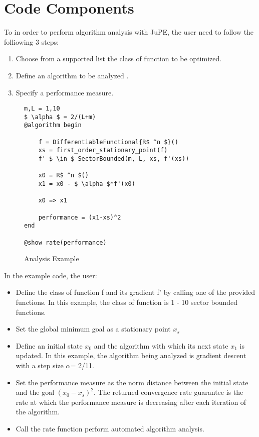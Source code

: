 \chapter{Code Components}

To in order to perform algorithm analysis with JuPE, the user need to follow the folliowing 3 steps:
\begin{enumerate}
	\item Choose from a supported list the class of function to be optimized.
	\item Define an algorithm to be analyzed .
	\item Specify a performance measure.
  \end{enumerate}
 
\begin{figure}[hbtp]
	\begin{lstlisting}[mathescape]
m,L = 1,10
$ \alpha $ = 2/(L+m)
@algorithm begin

	f = DifferentiableFunctional{R$ ^n $}()
	xs = first_order_stationary_point(f)
	f' $ \in $ SectorBounded(m, L, xs, f'(xs))

	x0 = R$ ^n $()
	x1 = x0 - $ \alpha $*f'(x0)

	x0 => x1

	performance = (x1-xs)^2
end

@show rate(performance)
\end{lstlisting}
\caption{Analysis Example}
\label{ex_analysis}
\end{figure}

In the example code, the user:
\begin{itemize}
	\item Define the class of function f and its gradient f' by calling one of the provided functions. In this example, the class of function is 1 - 10 sector bounded functions.
	\item Set the global minimum goal as a stationary point $ x_s $
	\item Define an initial state $ x_0 $ and the algorithm with which its next state $ x_1$ is updated. In this example, the algorithm being analyzed is gradient descent with a step size $ \alpha $= 2/11.
	\item Set the performance measure as the norm distance between the initial state and the goal $ (x_0 - x_s)^2 $. The returned convergence rate guarantee is the rate at which the performance measure is decreasing after each iteration of the algorithm.
	\item Call the rate function perform automated algorithm analysis.
\end{itemize}

